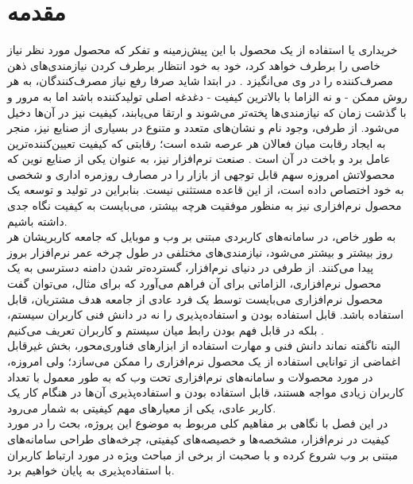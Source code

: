 \chapter{مقدمه}
خریداری یا استفاده از یک محصول با این پیش‌زمینه و تفکر که محصول مورد نظر نیاز خاصی را برطرف خواهد کرد، خود به خود انتظار برطرف کردن نیازمندی‌های ذهن مصرف‌کننده را در وی می‌انگیزد
\cite{___1389}.
در ابتدا شاید صرفا رفع نیاز مصرف‌کنندگان، به هر روش ممکن - و نه الزاما با بالاترین کیفیت - دغدغه اصلی تولیدکننده باشد اما به مرور و با گذشت زمان که نیازمندی‌ها پخته‌تر می‌شوند و ارتقا می‌یابند، کیفیت نیز در آن‌ها دخیل می‌شود. از طرفی، وجود نام و نشان‌های متعدد و متنوع در بسیاری از صنایع نیز، منجر به ایجاد رقابت میان فعالان هر عرصه شده است؛ رقابتی که کیفیت تعیین‌کننده‌ترین عامل برد و باخت در آن است
\cite{pressman_software_2015}.
صنعت نرم‌افزار نیز، به عنوان یکی از صنایع نوین که محصولاتش امروزه سهم قابل توجهی از بازار را در مصارف روزمره اداری و شخصی به خود اختصاص داده است، از این قاعده مستثنی نیست. بنابراین در تولید و توسعه یک محصول نرم‌افزاری نیز به منظور موفقیت هرچه بیشتر، می‌بایست به کیفیت نگاه جدی داشته باشیم.\\
به طور خاص، در سامانه‌های کاربردی مبتنی بر وب و موبایل که جامعه کاربریشان هر روز بیشتر و بیشتر می‌شود، نیازمندی‌های مختلفی در طول چرخه عمر نرم‌افزار بروز پیدا می‌کنند. از طرفی در دنیای نرم‌افزار،  گسترده‌تر شدن دامنه دسترسی به یک محصول نرم‌افزاری، الزاماتی برای آن فراهم می‌آورد که برای مثال، می‌توان گفت محصول نرم‌افزاری می‌بایست توسط یک فرد عادی از جامعه هدف مشتریان، قابل استفاده باشد. قابل استفاده بودن و استفاده‌پذیری را نه در دانش فنی کاربران سیستم، بلکه در قابل فهم بودن رابط میان سیستم و کاربران تعریف می‌کنیم
\cite{albert_measuring_2013}.\\
البته ناگفته نماند دانش فنی و مهارت استفاده از ابزارهای فناوری‌محور، بخش غیرقابل اغماضی از توانایی استفاده از یک محصول نرم‌افزاری را ممکن می‌سازد؛ ولی امروزه، در مورد محصولات و سامانه‌های نرم‌افزاری تحت وب که به طور معمول با تعداد کاربران زیادی مواجه هستند، قابل استفاده بودن و استفاده‌پذیری آن‌ها در هنگام کار یک کاربر عادی، یکی از معیارهای مهم کیفیتی به شمار می‌رود.\\
در این فصل با نگاهی بر مفاهیم کلی مربوط به موضوع این پروژه، بحث را در مورد کیفیت در نرم‌افزار، مشخصه‌ها و خصیصه‌های کیفیتی، چرخه‌های طراحی سامانه‌های مبتنی بر وب شروع کرده و با صحبت از برخی از مباحث ویژه در مورد ارتباط کاربران با استفاده‌پذیری به پایان خواهیم برد.
